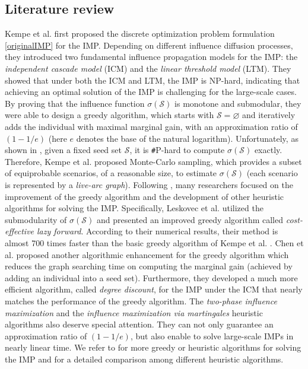 \documentclass[a4paper,10pt]{article}
\theoremstyle{plain}
\newcommand{\rev}[1]{{\color{black}#1}}
\newcommand{\revv}[1]{{#1}}
\begin{document}
	\subsection{Literature review}
	Kempe et al. \cite{Kempe2003} first proposed the discrete optimization problem formulation \eqref{originalIMP} for the IMP.
	Depending on different influence diffusion processes, they introduced two fundamental influence propagation models for the IMP: the {\emph{independent cascade model}} (ICM) and the {\emph{linear threshold model}} (LTM). 
	They showed that under both the ICM and LTM, the IMP is NP-hard, indicating that achieving an optimal solution of the IMP is challenging for the large-scale cases.
	By proving that the influence function $\sigma(\mathcal{S})$ is monotone and submodular, they were able to design a greedy algorithm, which starts with $\mathcal{S}=\varnothing$ and iteratively adds the individual with maximal marginal gain, 
	with an approximation ratio of $(1-1/e)$ (here $e$ denotes the base of the natural logarithm).
	Unfortunately, as shown in \cite{Chen2010,Chen2010scalable}, given a fixed seed set $\mathcal{S}$, it is \texttt{\#}P-hard to compute $\sigma(\mathcal{S})$ exactly.
	\rev{Therefore, Kempe et al. \cite{Kempe2003} proposed Monte-Carlo sampling, which provides a subset of equiprobable scenarios, of a reasonable size, to estimate $\sigma(\mathcal{S})$ (each scenario is represented by a \emph{live-arc graph}).}
	Following \cite{Kempe2003}, many researchers focused on \revv{the improvement of} the greedy algorithm and \revv{the development of} other heuristic algorithms for solving the IMP. 
	Specifically, Leskovec et al. \cite{Leskovec2007} utilized the submodularity of $\sigma(\mathcal{S})$ and presented an improved greedy algorithm called  \emph{cost-effective lazy forward}.
	According to their numerical results, their method is almost 700 times faster than the basic greedy algorithm of Kempe et al. \cite{Kempe2003}. 
	Chen et al. \cite{HEP} proposed another algorithmic enhancement for the greedy algorithm which reduces the graph searching time on computing \revv{the marginal gain (achieved by adding an individual into a seed set)}.
	Furthermore, they developed a much more efficient algorithm, called  \emph{degree discount}, for the IMP under the ICM that nearly matches the performance of the greedy algorithm.
	The \emph{two-phase influence maximization} \cite{Tang2014} and the \emph{influence maximization via martingales} \cite{Tang2015} heuristic algorithms also deserve special attention.
	They can not only guarantee an approximation ratio of  $(1-1/e)$, but also enable to solve large-scale IMPs in nearly linear time.
	We refer to \cite{Chen2010,Cheng2013,Galhotra2016,Kimura2006} for more greedy or heuristic algorithms for solving the IMP and \cite{Li2018} for a detailed comparison among different heuristic algorithms.
	
\end{document}

